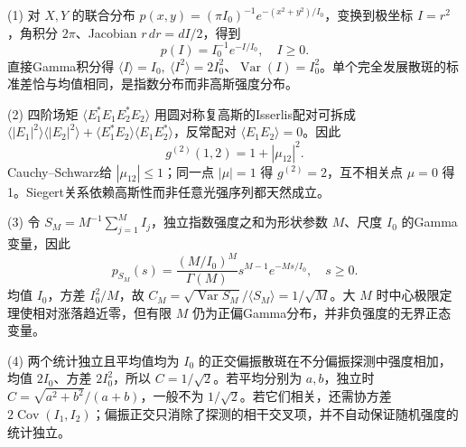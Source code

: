 (1) 对 \(X,Y\) 的联合分布 \(p(x,y)=(\pi I_0)^{-1}e^{-(x^2+y^2)/I_0}\)，变换到极坐标 \(I=r^2\)，角积分 \(2\pi\)、Jacobian \(r\,dr=dI/2\)，得到
\[
\boxed{p(I)=I_0^{-1}e^{-I/I_0}},\quad I\ge0.
\]
直接Gamma积分得 \(\langle I\rangle=I_0,\ \langle I^2\rangle=2I_0^2\)、\(\operatorname{Var}(I)=I_0^2\)。单个完全发展散斑的标准差恰与均值相同，是指数分布而非高斯强度分布。

(2) 四阶场矩 \(\langle E_1^*E_1E_2^*E_2\rangle\) 用圆对称复高斯的Isserlis配对可拆成
\(\langle |E_1|^2\rangle\langle |E_2|^2\rangle+
\langle E_1^*E_2\rangle\langle E_1E_2^*\rangle\)，反常配对 \(\langle E_1E_2\rangle=0\)。因此
\[
\boxed{g^{(2)}(1,2)=1+|\mu_{12}|^2}.
\]
Cauchy–Schwarz给 \(|\mu_{12}|\le1\)；同一点 \(|\mu|=1\) 得 \(g^{(2)}=2\)，互不相关点 \(\mu=0\) 得1。Siegert关系依赖高斯性而非任意光强序列都天然成立。

(3) 令 \(S_M=M^{-1}\sum_{j=1}^M I_j\)，独立指数强度之和为形状参数 \(M\)、尺度 \(I_0\) 的Gamma变量，因此
\[
p_{S_M}(s)=\frac{(M/I_0)^M}{\Gamma(M)}s^{M-1}e^{-Ms/I_0},\quad s\ge0.
\]
均值 \(I_0\)，方差 \(I_0^2/M\)，故 \(\boxed{C_M=\sqrt{\operatorname{Var}S_M}/\langle S_M\rangle=1/\sqrt M}\)。大 \(M\) 时中心极限定理使相对涨落趋近零，但有限 \(M\) 仍为正偏Gamma分布，并非负强度的无界正态变量。

(4) 两个统计独立且平均值均为 \(I_0\) 的正交偏振散斑在不分偏振探测中强度相加，均值 \(2I_0\)、方差 \(2I_0^2\)，所以 \(C=1/\sqrt2\)。若平均分别为 \(a,b\)，独立时 \(C=\sqrt{a^2+b^2}/(a+b)\)，一般不为 \(1/\sqrt2\)。若它们相关，还需协方差 \(2\operatorname{Cov}(I_1,I_2)\)；偏振正交只消除了探测的相干交叉项，并不自动保证随机强度的统计独立。
